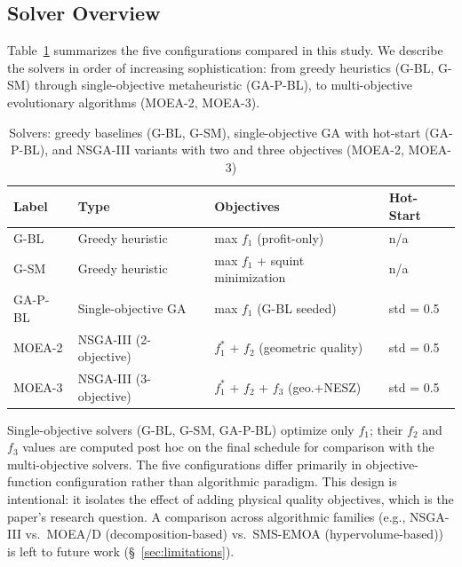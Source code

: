\documentclass[preprint,12pt,authoryear]{elsarticle}
\begin{document}
\subsection{Solver Overview}
Table~\ref{tab:solvers} summarizes the five configurations compared in this study.
We describe the solvers in order of increasing sophistication: from greedy heuristics
(G-BL, G-SM) through single-objective metaheuristic (GA-P-BL), to multi-objective
evolutionary algorithms (MOEA-2, MOEA-3).
\begin{table}[H]
\centering
\caption{Solvers: greedy baselines (G-BL, G-SM), single-objective GA with hot-start (GA-P-BL), and NSGA-III variants with two and three objectives (MOEA-2, MOEA-3)}
\label{tab:solvers}
\small
\setlength{\tabcolsep}{4pt}
\begin{tabular}{llll}
\toprule
\textbf{Label} & \textbf{Type} & \textbf{Objectives} & \textbf{Hot-Start} \\
\midrule
G-BL   & Greedy heuristic       & max $f_1$ (profit-only)                  & n/a \\
G-SM   & Greedy heuristic       & max $f_1$ + squint minimization          & n/a \\
GA-P-BL& Single-objective GA    & max $f_1$ (G-BL seeded)                  & std = 0.5 \\
MOEA-2 & NSGA-III (2-objective) & $f_1^*$ + $f_2$ (geometric quality)      & std = 0.5 \\
MOEA-3 & NSGA-III (3-objective) & $f_1^*$ + $f_2$ + $f_3$ (geo.+NESZ)     & std = 0.5 \\
\bottomrule
\end{tabular}
\end{table}
Single-objective solvers (G-BL, G-SM, GA-P-BL) optimize only $f_1$;
their $f_2$ and $f_3$ values are computed post hoc on the final schedule
for comparison with the multi-objective solvers.
The five configurations differ primarily in objective-function
configuration rather than algorithmic paradigm. This design is intentional:
it isolates the effect of adding physical quality objectives, which is the
paper's research question. A comparison across algorithmic families
(e.g., NSGA-III vs.\ MOEA/D (decomposition-based) vs.\ SMS-EMOA (hypervolume-based)) is left to future work
(\S~\ref{sec:limitations}).
\end{document}
